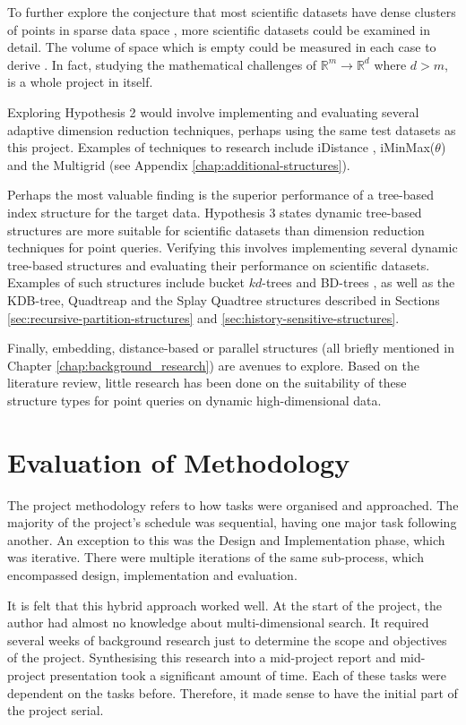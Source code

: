 To further explore the conjecture that most scientific datasets have dense clusters of points in sparse data space , more  scientific datasets could be examined in detail. The volume of space which is empty could be measured in each case to derive . In fact, studying the mathematical challenges of $\mathbb{R}^m \rightarrow \mathbb{R}^d$ where $d > m$, is a whole project in itself.

Exploring Hypothesis 2 would involve implementing and evaluating several adaptive dimension reduction techniques, perhaps using the same test datasets as this project. Examples of techniques to research include iDistance \cite{idistance}, iMinMax($\theta$) and the Multigrid (see Appendix \ref{chap:additional-structures}).

Perhaps the most valuable finding is the superior performance of a tree-based index structure for the target data. Hypothesis 3 states dynamic tree-based structures are more suitable for scientific datasets than dimension reduction techniques for point queries. Verifying this involves implementing several dynamic tree-based structures and evaluating their performance on scientific datasets. Examples of such structures include bucket $kd$-trees and BD-trees \cite{kdtree-v-bdtree}, as well as the KDB-tree, Quadtreap and the Splay Quadtree structures described in Sections \ref{sec:recursive-partition-structures} and \ref{sec:history-sensitive-structures}.

Finally, embedding, distance-based or parallel structures (all briefly mentioned in Chapter \ref{chap:background_research}) are avenues to explore. Based on the literature review, little research has been done on the suitability of these structure types for point queries on dynamic high-dimensional data.

\section{Evaluation of Methodology}

The project methodology refers to how tasks were organised and approached. The majority of the project's schedule was sequential, having one major task following another. An exception to this was the Design and Implementation phase, which was iterative. There were multiple iterations of the same sub-process, which encompassed design, implementation and evaluation. 

It is felt that this hybrid approach worked well. At the start of the project, the author had almost no knowledge about multi-dimensional search. It required several weeks of background research just to determine the scope and objectives of the project. Synthesising this research into a mid-project report and mid-project presentation took a significant amount of time. Each of these tasks were dependent on the tasks before. Therefore, it made sense to have the initial part of the project serial.

